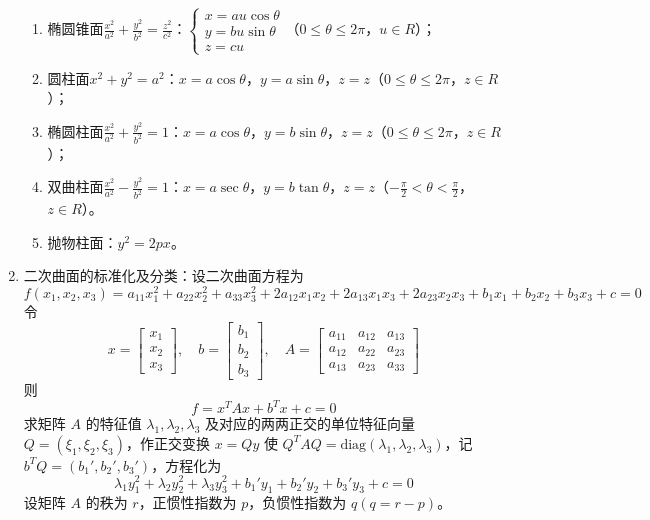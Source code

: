 \documentclass[UTF8]{ctexart}
\theoremstyle{remark}
\begin{document}
\begin{enumerate}
\begin{enumerate}
	\item 椭圆锥面$\frac{x^2}{a^2}+\frac{y^2}{b^2}=\frac{z^2}{c^2}$：$\begin{cases}x=a u\cos\theta\\y=b u\sin\theta\\z=c u\end{cases}$（$0\leq\theta\leq2\pi$，$u\in R$）；
	\item 圆柱面$x^2+y^2=a^2$：$x=a\cos\theta$，$y=a\sin\theta$，$z=z$（$0\leq\theta\leq2\pi$，$z\in R$）；
	\item 椭圆柱面$\frac{x^2}{a^2}+\frac{y^2}{b^2}=1$：$x=a\cos\theta$，$y=b\sin\theta$，$z=z$（$0\leq\theta\leq2\pi$，$z\in R$）；
	\item 双曲柱面$\frac{x^2}{a^2}-\frac{y^2}{b^2}=1$：$x=a\sec\theta$，$y=b\tan\theta$，$z=z$（$-\frac{\pi}{2}<\theta<\frac{\pi}{2}$，$z\in R$）。
\item 抛物柱面：\(y^{2} = 2px\)。
\end{enumerate}
\item 二次曲面的标准化及分类：设二次曲面方程为
\[
f(x_1, x_2, x_3) = a_{11}x_1^2 + a_{22}x_2^2 + a_{33}x_3^2 + 2a_{12}x_1x_2 + 2a_{13}x_1x_3 + 2a_{23}x_2x_3 + b_1x_1 + b_2x_2 + b_3x_3 + c = 0
\]
令
\[
x = \begin{bmatrix} x_1 \\ x_2 \\ x_3 \end{bmatrix}, \quad b = \begin{bmatrix} b_1 \\ b_2 \\ b_3 \end{bmatrix}, \quad A = \begin{bmatrix} a_{11} & a_{12} & a_{13} \\ a_{12} & a_{22} & a_{23} \\ a_{13} & a_{23} & a_{33} \end{bmatrix}
\]
则
\[
f = x^T A x + b^T x + c = 0
\]
求矩阵 \(A\) 的特征值 \(\lambda_1, \lambda_2, \lambda_3\) 及对应的两两正交的单位特征向量 \(Q = (\xi_1, \xi_2, \xi_3)\)，作正交变换 \(x = Qy\) 使 \(Q^T A Q = \text{diag}(\lambda_1, \lambda_2, \lambda_3)\)，记 \(b^T Q = (b_1', b_2', b_3')\)，方程化为
\[
\lambda_1 y_1^2 + \lambda_2 y_2^2 + \lambda_3 y_3^2 + b_1' y_1 + b_2' y_2 + b_3' y_3 + c = 0
\]
设矩阵 \(A\) 的秩为 \(r\)，正惯性指数为 \(p\)，负惯性指数为 \(q (q = r - p)\)。


\end{enumerate}
\end{document}
